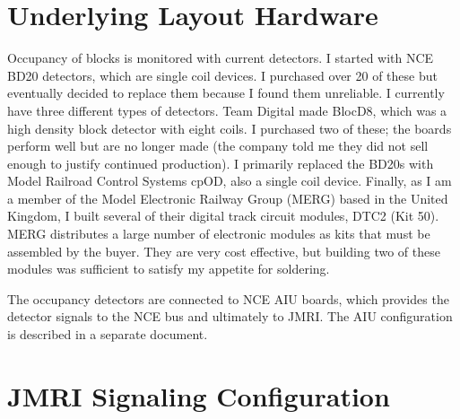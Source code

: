 \section{Underlying Layout Hardware}

Occupancy of blocks is monitored with current detectors.  I started with NCE BD20 detectors, which are single coil devices.  I purchased over 20 of these but eventually decided to replace them because I found them unreliable.  I currently have three different types of detectors.  Team Digital made BlocD8, which was a high density block detector with eight coils.  I purchased two of these;  the boards perform well but are no longer made (the company told me they did not sell enough to justify continued production).  I primarily replaced the BD20s with Model Railroad Control Systems cpOD, also a single coil device.  Finally, as I am a member of the Model Electronic Railway Group (MERG) based in the United Kingdom, I built several of their digital track circuit modules, DTC2 (Kit 50).  MERG distributes a large number of electronic modules as kits that must be assembled by the buyer.  They are very cost effective, but building two of these modules was sufficient to satisfy my appetite for soldering.

The occupancy detectors are connected to NCE AIU boards, which provides the detector signals to the NCE bus and ultimately to JMRI.  The AIU configuration is described in a separate document.

\section{JMRI Signaling Configuration}
